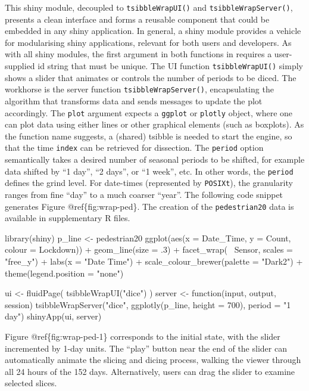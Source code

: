 This shiny module, decoupled to \texttt{tsibbleWrapUI()} and
\texttt{tsibbleWrapServer()}, presents a clean interface and forms a
reusable component that could be embedded in any shiny application. In
general, a shiny module provides a vehicle for modularising shiny
applications, relevant for both users and developers. As with all shiny
modules, the first argument in both functions in 
requires a user-supplied id string that must be unique. The UI function
\texttt{tsibbleWrapUI()} simply shows a slider that animates or controls
the number of periods to be diced. The workhorse is the server function
\texttt{tsibbleWrapServer()}, encapsulating the algorithm that
transforms data and sends messages to update the plot accordingly. The
\texttt{plot} argument expects a \texttt{ggplot} or \texttt{plotly}
object, where one can plot data using either lines or other graphical
elements (such as boxplots). As the function name suggests, a (shared)
tsibble is needed to start the engine, so that the time \texttt{index}
can be retrieved for dissection. The \texttt{period} option semantically
takes a desired number of seasonal periods to be shifted, for example
data shifted by ``1 day'', ``2 days'', or ``1 week'', etc. In other
words, the \texttt{period} defines the grind level. For date-times
(represented by \texttt{POSIXt}), the granularity ranges from fine
``day'' to a much coarser ``year''. The following code snippet generates
Figure @ref\{fig:wrap-ped\}. The creation of the \texttt{pedestrian20}
data is available in supplementary R files.

\begin{Schunk}
\begin{Sinput}
library(shiny)
p_line <- pedestrian20 %
  ggplot(aes(x = Date_Time, y = Count, colour = Lockdown)) +
  geom_line(size = .3) +
  facet_wrap(~ Sensor, scales = "free_y") +
  labs(x = "Date Time") +
  scale_colour_brewer(palette = "Dark2") +
  theme(legend.position = "none")

ui <- fluidPage(
  tsibbleWrapUI("dice")
)
server <- function(input, output, session) {
  tsibbleWrapServer("dice", ggplotly(p_line, height = 700), period = "1 day")
}
shinyApp(ui, server)
\end{Sinput}
\end{Schunk}

Figure @ref\{fig:wrap-ped-1\} corresponds to the initial state, with the
slider incremented by 1-day units. The ``play'' button near the end of
the slider can automatically animate the slicing and dicing process,
walking the viewer through all 24 hours of the 152 days. Alternatively,
users can drag the slider to examine selected slices.

